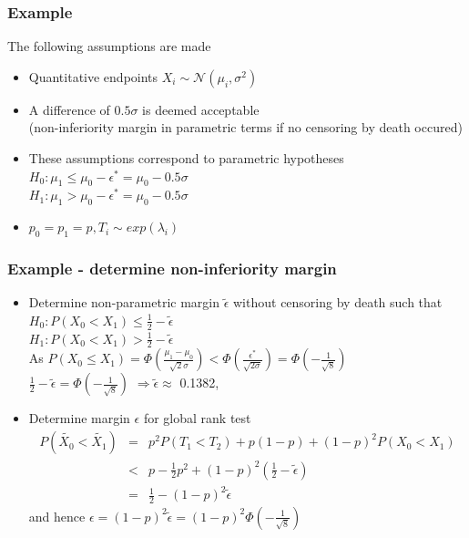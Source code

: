 \documentclass[xcolor=pdftex,dvipsnames,table]{beamer}\usepackage[]{graphicx}\usepackage[]{color}
\begin{document}
\begin{frame} %
\frametitle{Example}
The following assumptions are made
\begin{itemize}
  \item Quantitative endpoints $X_i \sim \mathcal{N} ( \mu_i, \sigma^2 ) $
  \item A difference of $0.5 \sigma$ is deemed acceptable \\
        (non-inferiority margin in parametric terms if no censoring by death occured)
  \item These assumptions correspond to parametric hypotheses \\
        $H_0: \mu_1 \leq \mu_0 - \epsilon^{*}  = \mu_0 - 0.5 \sigma $\\
        $H_1: \mu_1 > \mu_0 - \epsilon^{*} = \mu_0 - 0.5 \sigma $
  \item $p_0 = p_1 = p, T_i \sim exp(\lambda_i)$
\end{itemize}
\end{frame}

\begin{frame}[fragile] %
\frametitle{Example - determine non-inferiority margin}
\begin{itemize}
\item Determine non-parametric margin $\tilde{\epsilon}$ without censoring by death such that\\
        $H_0: P(X_0 < X_1) \leq \frac{1}{2} - \tilde{\epsilon}$ \\
        $H_1: P(X_0 < X_1) > \frac{1}{2} - \tilde{\epsilon}$ \\
        As $P(X_0 \leq X_1) = \Phi(\frac{\mu_1 - \mu_0}{\sqrt{2}\sigma}) < \Phi(\frac{\epsilon^{*}}{\sqrt{2\sigma}}) = \Phi(-\frac{1}{\sqrt{8}}) $ \\
      $\frac{1}{2} - \tilde{\epsilon} = \Phi(-\frac{1}{\sqrt{8}}) $ 
      $\Rightarrow \tilde{\epsilon} \approx $ 0.1382, \item Determine margin $\epsilon$ for global rank test
\begin{eqnarray*}
P(\tilde{X_0}  < \tilde{X_1}) & = & p^2 P(T_1 < T_2) + p(1-p) + (1 - p)^2 P(X_0 < X_1) \\
& < & p - \frac{1}{2}p^2 + (1-p)^2 (\frac{1}{2} - \tilde{\epsilon}) \\
& = & \frac{1}{2} - (1-p)^2 \tilde{\epsilon}
\end{eqnarray*}
and hence $\epsilon = (1-p)^2 \tilde{\epsilon} = (1-p)^2 \Phi(-\frac{1}{\sqrt{8}})$
\end{itemize}
\end{frame}
\end{document}
